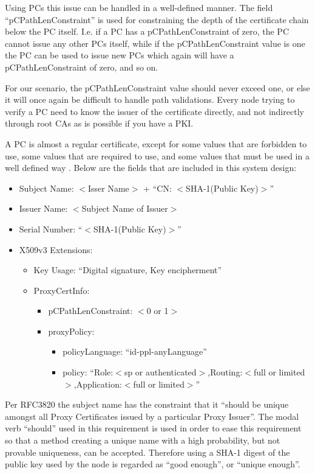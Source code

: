 Using \acp{PC} this issue can be handled in a well-defined manner. The field
``pCPathLenConstraint'' is used for constraining the depth of the certificate
chain below the \ac{PC} itself. I.e. if a \ac{PC} has a pCPathLenConstraint of
zero, the \ac{PC} cannot issue any other \acp{PC} itself, while if the 
pCPathLenConstraint value is one the \ac{PC} can be used to issue new \acp{PC}
which again will have a pCPathLenConstraint of zero, and so on.

For our scenario, the pCPathLenConstraint value should never exceed one, or else
it will once again be difficult to handle path validations. Every node trying to
verify a \ac{PC} need to know the issuer of the certificate directly, and not
indirectly through root \acp{CA} as is possible if you have a \ac{PKI}.

A \ac{PC} is almost a regular certificate, except for some values that are
forbidden to use, some values that are required to use, and some values that
must be used in a well defined way \cite{rfc3820}. Below are the
fields that are included in this system design:
\begin{itemize}
  \item Subject Name: $<$Isser Name$>$ + ``CN: $<$SHA-1(Public Key)$>$''
  \item Issuer Name: $<$Subject Name of Issuer$>$
  \item Serial Number: ``$<$SHA-1(Public Key)$>$''
  \item X509v3 Extensions:
  \begin{itemize}
    \item Key Usage: ``Digital signature, Key encipherment''
    \item ProxyCertInfo:
    \begin{itemize}
      \item pCPathLenConstraint: $<$0 or 1$>$
      \item proxyPolicy: 
      \begin{itemize}
        \item policyLanguage: ``id-ppl-anyLanguage''
        \item policy: ``Role:$<$sp or authenticated$>$,Routing:$<$full or limited$>$,Application:$<$full or limited$>$''
      \end{itemize}
    \end{itemize}
  \end{itemize}
\end{itemize}
Per RFC3820 \cite{rfc3820} the subject name has the constraint that it
``should be unique amongst all Proxy Certificates issued by a particular Proxy
Issuer''. The modal verb ``should'' used in this requirement is used in order
to ease this requirement so that a method creating a unique name with a high
probability, but not provable uniqueness, can be accepted. Therefore using a
SHA-1 digest of the public key used by the node is regarded as ``good enough'',
or ``unique enough''.

